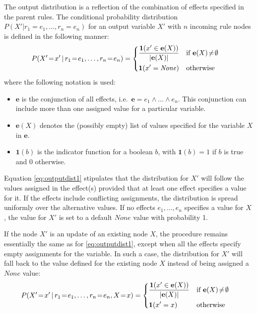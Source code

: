 The output distribution is a reflection of the combination of effects specified in the parent rules. The conditional probability distribution $P(X'|r_1\!=\!e_1, \dots, r_n\!=\!e_n)$ for an output variable $X'$ with $n$ incoming rule nodes is defined in the following manner:
\begin{align}
&P(X'\!=\!x' \, | \, r_1\!=\!e_1, \dots, r_n\!=\!e_n) = \begin{dcases}
\frac{\mathbf{1}(x' \in {\mathbf{e}(X)})} { |\mathbf{e}(X)| } & \text{if } \mathbf{e}(X)\!\neq\!\emptyset \\
\mathbf{1}(x' = \mathit{None}) & \text{otherwise}
\end{dcases}
\label{eq:outputdist1}
\end{align}
where the following notation is used: \begin{itemize}
\item $\mathbf{e}$ is the conjunction of all effects, i.e.\ $\mathbf{e} = e_1 \land \dots \land e_n$.  This conjunction can include more than one assigned value for a particular variable.
\item $\mathbf{e}(X)$ denotes the (possibly empty) list of values specified for the variable $X$ in $\mathbf{e}$. 
\item $\mathbf{1}(b)$ is the indicator function for a boolean $b$, with $\mathbf{1}(b)=1$ if $b$ is true and $0$ otherwise.
\end{itemize}

Equation \eqref{eq:outputdist1} stipulates that the distribution for $X'$ will follow the values assigned in the effect(s) provided that at least one effect specifies a value for it. If the effects include conflicting assignments, the distribution is spread uniformly over the alternative values. If no effects $e_1, \dots, e_n$ specifies a value for $X$ , the value for $X'$ is set to a default $None$ value with probability 1. 

If the node $X'$ is an update of an existing node $X$, the procedure remains essentially the same as for \eqref{eq:outputdist1}, except when all the effects specify empty assignments for the variable. In such a case, the distribution for $X'$ will fall back to the value defined for the existing node $X$ instead of being assigned a $\mathit{None}$ value:
\begin{align}
&P(X'\!=\!x' \, | \, r_1\!=\!e_1, \dots, r_n\!=\!e_n, X\!=\!x) = \begin{dcases} 
\frac{\mathbf{1}(x' \in {\mathbf{e}(X)})} { |\mathbf{e}(X)| }  & \text{if } \mathbf{e}(X)\!\neq\!\emptyset \\
\mathbf{1}(x' = x) & \text{otherwise}
\end{dcases}\label{eq:outputdist2}
\end{align}

